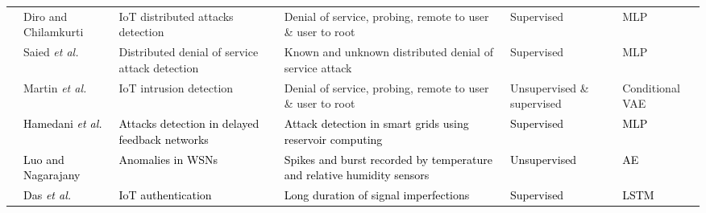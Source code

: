 \documentclass[journal,comsoc,letter]{IEEEtran}
\newcommand{\edit}[1]{\textcolor{black}{#1}}
\begin{document}
\begin{table*}[h!]
\begin{tabular}{|c|C{2.1cm}|C{3.3cm}|C{6cm}|C{1.7cm}|C{1.7cm}|}
                                      & Diro and Chilamkurti \cite{diro2017distributed}          & IoT distributed attacks detection                                & Denial of service, probing, remote to user \& user to root                                                                            & Supervised                 & MLP                                                      \\  
                                      & Saied \emph{et al.} \cite{saied2016detection}            & Distributed denial of service attack detection                  & Known and unknown distributed denial of service attack                                                                                & Supervised                 & MLP                                                      \\  
                                      & Martin \emph{et al.} \cite{lopez2017conditional}         & IoT intrusion detection                                         & Denial of service, probing, remote to user \& user to root                                                                            & Unsupervised \& supervised & Conditional VAE                                          \\  
                                      & \edit{Hamedani \emph{et al.} \cite{hamedani2018reservoir}} & \edit{Attacks detection in delayed feedback networks}             & \edit{Attack detection in smart grids using reservoir computing}                                                                        & \edit{Supervised}            & \edit{MLP}                                                 \\  
                                      & \edit{Luo and Nagarajany \cite{luo2018distributed}}        & \edit{Anomalies in WSNs}                                          & \edit{Spikes and burst recorded by temperature and relative humidity sensors}                                                           & \edit{Unsupervised}          & \edit{AE}                                                  \\  
                                      & \edit{Das \emph{et al.} \cite{das2018deep}}                & \edit{IoT authentication}                                         & \edit{Long duration of signal imperfections}                                                                                            & \edit{Supervised}            & \edit{LSTM}                                                \\  

\end{tabular}
\end{table*}
\end{document}
